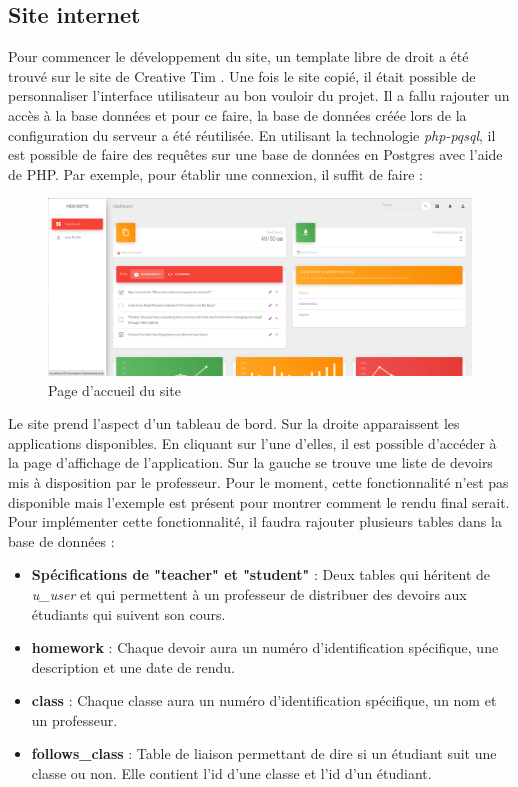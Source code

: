 \subsection{Site internet}
Pour commencer le développement du site, un template libre de droit a été trouvé sur le site de Creative Tim \cite{creatim}.
Une fois le site copié, il était possible de personnaliser l'interface utilisateur au bon vouloir du projet.
Il a fallu rajouter un accès à la base données et pour ce faire, la base de données créée lors de la configuration du serveur a été réutilisée.
\newline
En utilisant la technologie \textit{php-pqsql}, il est possible de faire des requêtes sur une base de données en Postgres avec l'aide de PHP.
Par exemple, pour établir une connexion, il suffit de faire : 
\begin{figure}[H]
	\centering
	\includegraphics[scale=0.2]{images/website.png}
	\caption{Page d'accueil du site}
	\label{fig:website}
\end{figure}
Le site prend l'aspect d'un tableau de bord. 
Sur la droite apparaissent les applications disponibles. 
En cliquant sur l'une d'elles, il est possible d'accéder à la page d'affichage de l'application.
Sur la gauche se trouve une liste de devoirs mis à disposition par le professeur.
Pour le moment, cette fonctionnalité n'est pas disponible mais l'exemple est présent pour montrer comment le rendu final serait.
Pour implémenter cette fonctionnalité, il faudra rajouter plusieurs tables dans la base de données :
\begin{itemize}
	\item \textbf{Spécifications de "teacher" et "student"} : Deux tables qui héritent de \textit{u\_user} et qui permettent à un professeur de distribuer des devoirs aux étudiants qui suivent son cours.
	\item \textbf{homework} : Chaque devoir aura un numéro d'identification spécifique, une description et une date de rendu.
	\item \textbf{class} : Chaque classe aura un numéro d'identification spécifique, un nom et un professeur.
	\item \textbf{follows\_class} : Table de liaison permettant de dire si un étudiant suit une classe ou non. Elle contient l'id d'une classe et l'id d'un étudiant.
\end{itemize}

